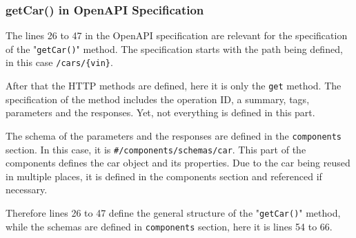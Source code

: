 \subsubsection*{getCar() in OpenAPI Specification}
The lines 26 to 47 in the OpenAPI specification are relevant for the specification of the "\texttt{getCar()}" method.
The specification starts with the path being defined, in this case \texttt{/cars/\{vin\}}.

After that the HTTP methods are defined, here it is only the \texttt{get} method.
The specification of the method includes the operation ID, a summary, tags, parameters and the responses.
Yet, not everything is defined in this part.

The schema of the parameters and the responses are defined in the \texttt{components} section.
In this case, it is \texttt{\#/components/schemas/car}.
This part of the components defines the car object and its properties.
Due to the car being reused in multiple places, it is defined in the components section and referenced if necessary.

Therefore lines 26 to 47 define the general structure of the "\texttt{getCar()}" method, while the schemas are defined in \texttt{components} section, here it is lines 54 to 66.